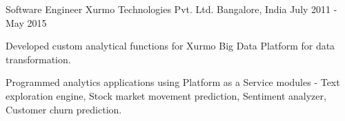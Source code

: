 \begin{cventries}
{\begin{cvitems}
      \end{cvitems}
    }
  \cventry
    {Software Engineer}
    {Xurmo Technologies Pvt. Ltd.}
    {Bangalore, India}
    {July 2011 - May 2015}
    {
      \begin{cvitems}
        \item {Developed custom analytical functions for Xurmo Big Data Platform for data transformation.}
        \item {Programmed analytics applications using Platform as a Service modules - Text exploration engine, Stock market movement prediction, Sentiment analyzer, Customer churn prediction.}
      \end{cvitems} 
    }
\end{cventries}
